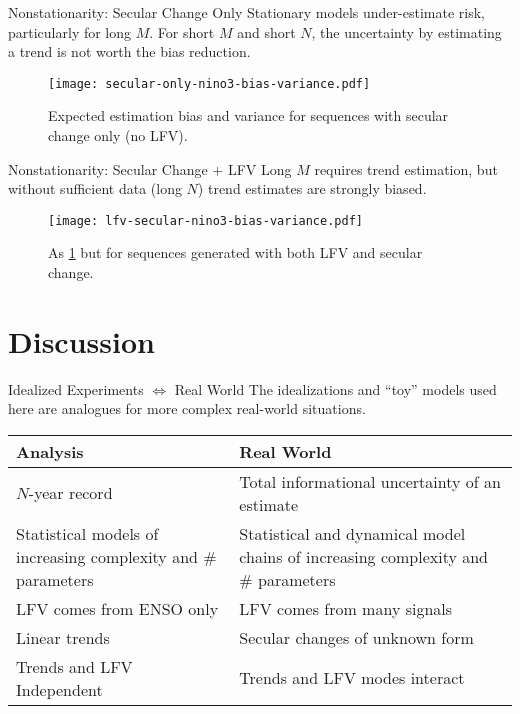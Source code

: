 \documentclass[
  10pt,     %
  handout   %
]{beamer}
\begin{document}
\begin{frame}{Nonstationarity: Secular Change Only}
  Stationary models under-estimate risk, particularly for long $M$.
  For short $M$ and short $N$, the uncertainty by estimating a trend is not worth the bias reduction.
  \begin{figure}
    \centering
    \texttt{[image: secular-only-nino3-bias-variance.pdf]}
    \caption{
      Expected estimation bias and variance for sequences with secular change only (no LFV).
    }\label{fig:secular-nino3-bias-variance}
  \end{figure}
\end{frame}

\begin{frame}{Nonstationarity: Secular Change + LFV}
  Long $M$ requires trend estimation, but without sufficient data (long $N$) trend estimates are strongly biased.

  \begin{figure}
    \centering
    \texttt{[image: lfv-secular-nino3-bias-variance.pdf]}
    \caption{
      As \cref{fig:secular-nino3-bias-variance} but for sequences generated with both LFV and secular change.
    }\label{fig:lfv-secular-nino3-bias-variance}
  \end{figure}
\end{frame}

\section{Discussion}

\begin{frame}{Idealized Experiments $\iff$ Real World}
  The idealizations and ``toy'' models used here are analogues for more complex real-world situations.
  \begin{table}
    \begin{tabular}{L{0.425\textwidth}L{0.525\textwidth}}
      \toprule
      Analysis & Real World \\\midrule
      $N$-year record & Total informational uncertainty of an estimate \\\midrule
      Statistical models of increasing complexity and \# parameters & Statistical and dynamical model chains of increasing complexity and \# parameters \\\midrule
      LFV comes from ENSO only & LFV comes from many signals \\\midrule
      Linear trends & Secular changes of unknown form \\\midrule
      Trends and LFV Independent & Trends and LFV modes interact\\
      \bottomrule
    \end{tabular}
  \end{table}
\end{frame}
\end{document}
